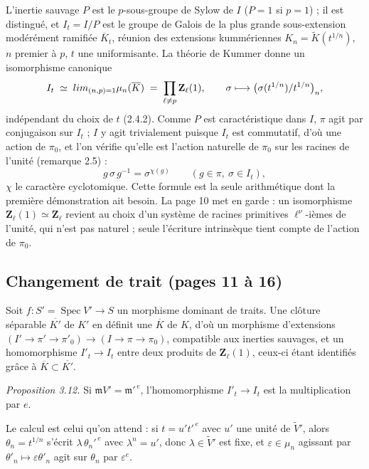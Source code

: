 \documentclass[11pt,a4paper]{article}
\begin{document}
L'inertie sauvage $P$ est le $p$-sous-groupe de Sylow de $I$ ($P = 1$ si
$p = 1$) ; il est distingué, et $I_t = I/P$ est le groupe de Galois de la plus
grande sous-extension modérément ramifiée $\overline K_t$, réunion des extensions
kummériennes $K_n = \widetilde K(t^{1/n})$, $n$ premier à $p$, $t$ une
uniformisante. La théorie de Kummer donne un isomorphisme canonique
\[
  I_t \;\simeq\; \varprojlim_{(n,p)=1} \mu_n(\overline K) \;=\; \prod_{\ell \neq p}\mathbf{Z}_\ell(1),
  \qquad \sigma \longmapsto \bigl(\sigma(t^{1/n})/t^{1/n}\bigr)_n ,
\]
indépendant du choix de $t$ (2.4.2). Comme $P$ est caractéristique dans $I$,
$\pi$ agit par conjugaison sur $I_t$ ; $I$ y agit trivialement puisque $I_t$ est
commutatif, d'où une action de $\pi_0$, et l'on vérifie qu'elle est l'action
naturelle de $\pi_0$ sur les racines de l'unité (remarque 2.5) :
\[
  g\,\sigma\,g^{-1} = \sigma^{\chi(g)} \qquad (g \in \pi,\ \sigma \in I_t),
\]
$\chi$ le caractère cyclotomique. Cette formule est la seule arithmétique dont
la première démonstration ait besoin. La page 10 met en garde : un isomorphisme
$\mathbf{Z}_\ell(1) \simeq \mathbf{Z}_\ell$ revient au choix d'un système de
racines primitives $\ell^\nu$-ièmes de l'unité, qui n'est pas naturel ; seule
l'écriture intrinsèque tient compte de l'action de $\pi_0$.

\subsection*{Changement de trait (pages 11 à 16)}

Soit $f : S' = \operatorname{Spec} V' \to S$ un morphisme dominant de traits.
Une clôture séparable $\overline{K'}$ de $K'$ en définit une $\overline K$ de
$K$, d'où un morphisme d'extensions $(I' \to \pi' \to \pi'_0) \to
(I \to \pi \to \pi_0)$, compatible aux inerties sauvages, et un homomorphisme
$I'_t \to I_t$ entre deux produits de $\mathbf{Z}_\ell(1)$, ceux-ci étant
identifiés grâce à $\overline K \subset \overline{K'}$.

\emph{Proposition 3.12.} Si $\mathfrak{m}V' = \mathfrak{m}'^{\,e}$, l'homomorphisme
$I'_t \to I_t$ est la multiplication par $e$.

Le calcul est celui qu'on attend : si $t = u' t'^{\,e}$ avec $u'$ une unité de
$\widetilde V'$, alors $\theta_n = t^{1/n}$ s'écrit $\lambda\,\theta_n'^{\,e}$
avec $\lambda^n = u'$, donc $\lambda \in \widetilde V'$ est fixe, et
$\varepsilon \in \mu_n$ agissant par $\theta'_n \mapsto \varepsilon\theta'_n$
agit sur $\theta_n$ par $\varepsilon^e$.
\end{document}
